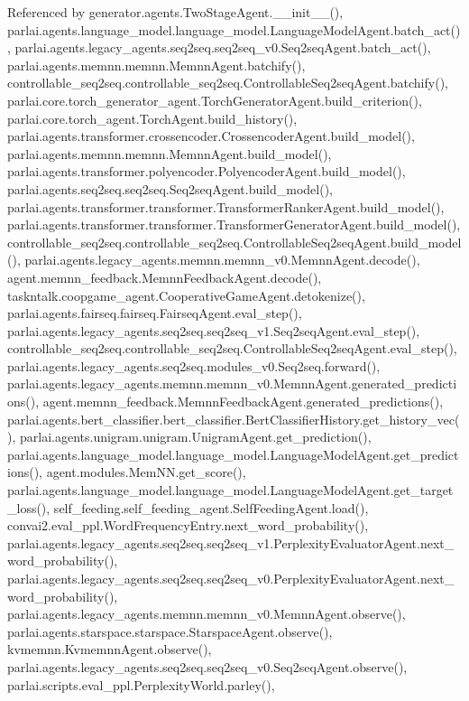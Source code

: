 Referenced by generator.\+agents.\+Two\+Stage\+Agent.\+\_\+\+\_\+init\+\_\+\+\_\+(), parlai.\+agents.\+language\+\_\+model.\+language\+\_\+model.\+Language\+Model\+Agent.\+batch\+\_\+act(), parlai.\+agents.\+legacy\+\_\+agents.\+seq2seq.\+seq2seq\+\_\+v0.\+Seq2seq\+Agent.\+batch\+\_\+act(), parlai.\+agents.\+memnn.\+memnn.\+Memnn\+Agent.\+batchify(), controllable\+\_\+seq2seq.\+controllable\+\_\+seq2seq.\+Controllable\+Seq2seq\+Agent.\+batchify(), parlai.\+core.\+torch\+\_\+generator\+\_\+agent.\+Torch\+Generator\+Agent.\+build\+\_\+criterion(), parlai.\+core.\+torch\+\_\+agent.\+Torch\+Agent.\+build\+\_\+history(), parlai.\+agents.\+transformer.\+crossencoder.\+Crossencoder\+Agent.\+build\+\_\+model(), parlai.\+agents.\+memnn.\+memnn.\+Memnn\+Agent.\+build\+\_\+model(), parlai.\+agents.\+transformer.\+polyencoder.\+Polyencoder\+Agent.\+build\+\_\+model(), parlai.\+agents.\+seq2seq.\+seq2seq.\+Seq2seq\+Agent.\+build\+\_\+model(), parlai.\+agents.\+transformer.\+transformer.\+Transformer\+Ranker\+Agent.\+build\+\_\+model(), parlai.\+agents.\+transformer.\+transformer.\+Transformer\+Generator\+Agent.\+build\+\_\+model(), controllable\+\_\+seq2seq.\+controllable\+\_\+seq2seq.\+Controllable\+Seq2seq\+Agent.\+build\+\_\+model(), parlai.\+agents.\+legacy\+\_\+agents.\+memnn.\+memnn\+\_\+v0.\+Memnn\+Agent.\+decode(), agent.\+memnn\+\_\+feedback.\+Memnn\+Feedback\+Agent.\+decode(), taskntalk.\+coopgame\+\_\+agent.\+Cooperative\+Game\+Agent.\+detokenize(), parlai.\+agents.\+fairseq.\+fairseq.\+Fairseq\+Agent.\+eval\+\_\+step(), parlai.\+agents.\+legacy\+\_\+agents.\+seq2seq.\+seq2seq\+\_\+v1.\+Seq2seq\+Agent.\+eval\+\_\+step(), controllable\+\_\+seq2seq.\+controllable\+\_\+seq2seq.\+Controllable\+Seq2seq\+Agent.\+eval\+\_\+step(), parlai.\+agents.\+legacy\+\_\+agents.\+seq2seq.\+modules\+\_\+v0.\+Seq2seq.\+forward(), parlai.\+agents.\+legacy\+\_\+agents.\+memnn.\+memnn\+\_\+v0.\+Memnn\+Agent.\+generated\+\_\+predictions(), agent.\+memnn\+\_\+feedback.\+Memnn\+Feedback\+Agent.\+generated\+\_\+predictions(), parlai.\+agents.\+bert\+\_\+classifier.\+bert\+\_\+classifier.\+Bert\+Classifier\+History.\+get\+\_\+history\+\_\+vec(), parlai.\+agents.\+unigram.\+unigram.\+Unigram\+Agent.\+get\+\_\+prediction(), parlai.\+agents.\+language\+\_\+model.\+language\+\_\+model.\+Language\+Model\+Agent.\+get\+\_\+predictions(), agent.\+modules.\+Mem\+N\+N.\+get\+\_\+score(), parlai.\+agents.\+language\+\_\+model.\+language\+\_\+model.\+Language\+Model\+Agent.\+get\+\_\+target\+\_\+loss(), self\+\_\+feeding.\+self\+\_\+feeding\+\_\+agent.\+Self\+Feeding\+Agent.\+load(), convai2.\+eval\+\_\+ppl.\+Word\+Frequency\+Entry.\+next\+\_\+word\+\_\+probability(), parlai.\+agents.\+legacy\+\_\+agents.\+seq2seq.\+seq2seq\+\_\+v1.\+Perplexity\+Evaluator\+Agent.\+next\+\_\+word\+\_\+probability(), parlai.\+agents.\+legacy\+\_\+agents.\+seq2seq.\+seq2seq\+\_\+v0.\+Perplexity\+Evaluator\+Agent.\+next\+\_\+word\+\_\+probability(), parlai.\+agents.\+legacy\+\_\+agents.\+memnn.\+memnn\+\_\+v0.\+Memnn\+Agent.\+observe(), parlai.\+agents.\+starspace.\+starspace.\+Starspace\+Agent.\+observe(), kvmemnn.\+Kvmemnn\+Agent.\+observe(), parlai.\+agents.\+legacy\+\_\+agents.\+seq2seq.\+seq2seq\+\_\+v0.\+Seq2seq\+Agent.\+observe(), parlai.\+scripts.\+eval\+\_\+ppl.\+Perplexity\+World.\+parley(), 